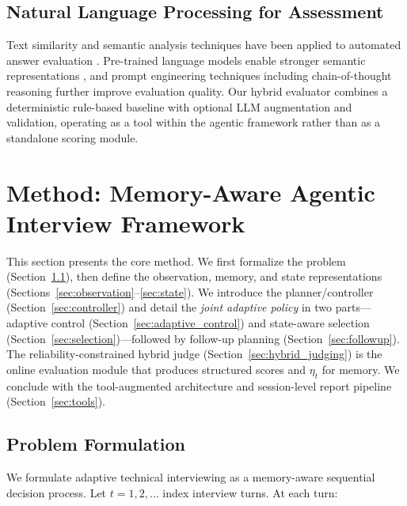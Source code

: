 ﻿\documentclass[final,3p,times,authoryear]{elsarticle}
\begin{document}
\subsection{Natural Language Processing for Assessment}

\noindent Text similarity and semantic analysis techniques have been applied to automated answer evaluation \cite{burrows2015eraser,mohler2011evaluation}. Pre-trained language models enable stronger semantic representations \cite{devlin2018bert}, and prompt engineering techniques including chain-of-thought reasoning \cite{wei2022chain} further improve evaluation quality. Our hybrid evaluator combines a deterministic rule-based baseline with optional LLM augmentation and validation, operating as a tool within the agentic framework rather than as a standalone scoring module.

\section{Method: Memory-Aware Agentic Interview Framework}
\label{sec:method}

This section presents the core method. We first formalize the problem (Section~\ref{sec:formulation}), then define the observation, memory, and state representations (Sections~\ref{sec:observation}--\ref{sec:state}). We introduce the planner/controller (Section~\ref{sec:controller}) and detail the \emph{joint adaptive policy} in two parts---adaptive control (Section~\ref{sec:adaptive_control}) and state-aware selection (Section~\ref{sec:selection})---followed by follow-up planning (Section~\ref{sec:followup}). The reliability-constrained hybrid judge (Section~\ref{sec:hybrid_judging}) is the online evaluation module that produces structured scores and $\eta_t$ for memory. We conclude with the tool-augmented architecture and session-level report pipeline (Section~\ref{sec:tools}).

\subsection{Problem Formulation}
\label{sec:formulation}

\noindent We formulate adaptive technical interviewing as a memory-aware sequential decision process. Let $t = 1, 2, \ldots$ index interview turns. At each turn:
\end{document}
